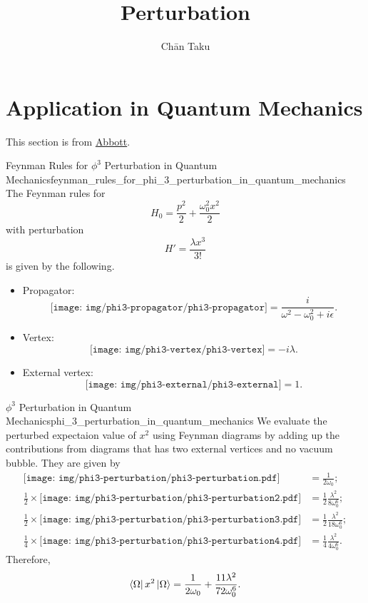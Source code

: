 \documentclass{article}
\title{Perturbation}
\author{Ch\=an Taku}
\begin{document}
\maketitle

\section{Application in Quantum Mechanics}

This section is from \href{ref/Abbott-Feynman-Diagrams.pdf}{Abbott}.

\begin{proposition}{Feynman Rules for $\phi^3$ Perturbation in Quantum Mechanics}{feynman_rules_for_phi_3_perturbation_in_quantum_mechanics}
    The Feynman rules for
    \[ H_0 = \frac{p^2}{2} + \frac{\omega_0^2 x^2}{2} \]
    with perturbation
    \[ H' = \frac{\lambda x^3}{3!} \]
    is given by the following.
    \begin{itemize}
        \item Propagator:
        \[ \texttt{[image: img/phi3-propagator/phi3-propagator]} = \frac{i}{\omega^2 - \omega_0^2 + i\epsilon}. \]
        \item Vertex:
        \[ \texttt{[image: img/phi3-vertex/phi3-vertex]} = -i\lambda. \]
        \item External vertex:
        \[ \texttt{[image: img/phi3-external/phi3-external]} = 1. \]
    \end{itemize}
\end{proposition}

\begin{example}{$\phi^3$ Perturbation in Quantum Mechanics}{phi_3_perturbation_in_quantum_mechanics}
    We evaluate the perturbed expectaion value of $x^2$ using Feynman diagrams by adding up the contributions from diagrams that has two external vertices and no vacuum bubble.
    They are given by
    \begin{align*}
        \texttt{[image: img/phi3-perturbation/phi3-perturbation.pdf]} &= \frac{1}{2\omega_0}; \\
        \frac{1}{2} \times \texttt{[image: img/phi3-perturbation/phi3-perturbation2.pdf]} &= \frac{1}{2} \frac{\lambda^2}{8\omega_0^6}; \\
        \frac{1}{2} \times \texttt{[image: img/phi3-perturbation/phi3-perturbation3.pdf]} &= \frac{1}{2} \frac{\lambda^2}{18\omega_0^6}; \\
        \frac{1}{4} \times \texttt{[image: img/phi3-perturbation/phi3-perturbation4.pdf]} &= \frac{1}{4} \frac{\lambda^2}{4\omega_0^6}.
    \end{align*}
    Therefore,
    \[ \bra{\Omega}x^2\ket{\Omega} = \frac{1}{2\omega_0} + \frac{11\lambda^2}{72\omega_0^6}. \]
\end{example}
\end{document}

